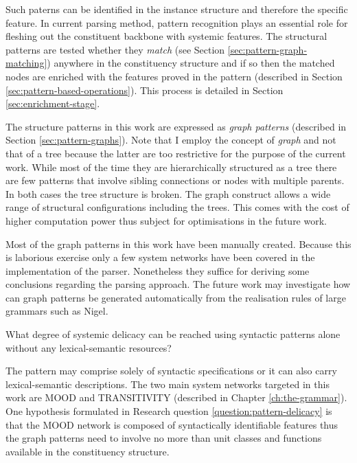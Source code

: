 Such paterns can be identified in the instance structure and therefore the specific feature. In current parsing method, pattern recognition plays an essential role for fleshing out the constituent backbone with systemic features. The structural patterns are tested whether they \textit{match} (see Section \ref{sec:pattern-graph-matching}) anywhere in the constituency structure and if so then the matched nodes are enriched with the features proved in the pattern (described in Section \ref{sec:pattern-based-operations}). This process is detailed in Section \ref{sec:enrichment-stage}. 

The structure patterns in this work are expressed as \textit{graph patterns} (described in Section \ref{sec:pattern-graphs}). Note that I employ the concept of \textit{graph} and not that of a tree because the latter are too restrictive for the purpose of the current work. While most of the time they are hierarchically structured as a tree there are few patterns that involve sibling connections or nodes with multiple parents. In both cases the tree structure is broken. The graph construct allows a wide range of structural configurations including the trees. This comes with the cost of higher computation power thus subject for optimisations in the future work. 


Most of the graph patterns in this work have been manually created. Because this is laborious exercise only a few system networks have been covered in the implementation of the parser. Nonetheless they suffice for deriving some conclusions regarding the parsing approach. The future work may investigate how can graph patterns be generated automatically from the realisation rules of large grammars such as Nigel. 

\begin{question}\label{question:pattern-delicacy}
    What degree of systemic delicacy can be reached using syntactic patterns alone without any lexical-semantic resources?
\end{question}

The pattern may comprise solely of syntactic specifications or it can also carry lexical-semantic descriptions. 
The two main system networks targeted in this work are MOOD and TRANSITIVITY (described in Chapter \ref{ch:the-grammar}). One hypothesis formulated in Research question \ref{question:pattern-delicacy} is that the MOOD network is composed of syntactically identifiable features thus the graph patterns need to involve no more than unit classes and functions available in the constituency structure. 

